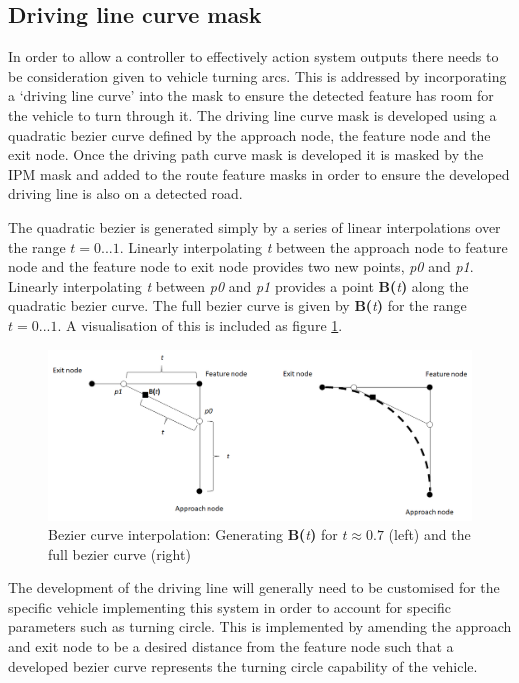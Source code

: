 \documentclass[]{aiaa-tc}%
\begin{document}
\subsection{Driving line curve mask} \label{s:drivingPathMatching}

In order to allow a controller to effectively action system outputs there needs to be consideration given to vehicle turning arcs. This is addressed by incorporating a `driving line curve' into the mask to ensure the detected feature has room for the vehicle to turn through it. The driving line curve mask is developed using a quadratic bezier curve defined by the approach node, the feature node and the exit node. Once the driving path curve mask is developed it is masked by the IPM mask and added to the route feature masks in order to ensure the developed driving line is also on a detected road. 

The quadratic bezier is generated simply by a series of linear interpolations over the range $t=0...1$. Linearly interpolating \textit{t} between the approach node to feature node and the feature node to exit node provides two new points, \textit{p0} and \textit{p1}. Linearly interpolating \textit{t} between \textit{p0} and \textit{p1} provides a point \textbf{B(}\textit{t}\textbf{)} along the quadratic bezier curve. The full bezier curve is given by \textbf{B(}\textit{t}\textbf{)} for the range $t=0...1$. A visualisation of this is included as figure \ref{f:quadraticBezier}.

\begin{figure}
	\centering
	\includegraphics[width=1\textwidth]{bezier/quadraticBezier.png}
	\caption{Bezier curve interpolation: Generating \textbf{B(}\textit{t}\textbf{)} for $t\approx0.7$ (left) and the full bezier curve (right)}
	\label{f:quadraticBezier}
\end{figure}

The development of the driving line will generally need to be customised for the specific vehicle implementing this system in order to account for specific parameters such as turning circle. This is implemented by amending the approach and exit node to be a desired distance from the feature node such that a developed bezier curve represents the turning circle capability of the vehicle. 
\end{document}
